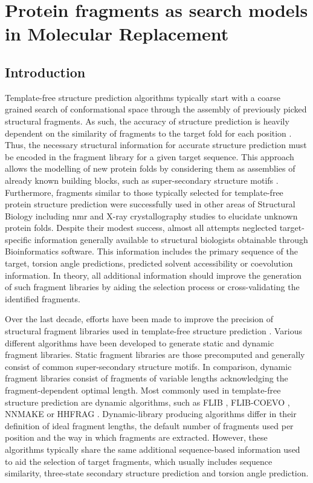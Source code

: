 \chapter{Protein fragments as search models in Molecular Replacement} \label{chap:ample_flib}
\clearpage

\section{Introduction}
Template-free structure prediction algorithms typically start with a coarse grained search of conformational space through the assembly of previously picked structural fragments. As such, the accuracy of structure prediction is heavily dependent on the similarity of fragments to the target fold for each position \cite{Gront2011-sv}. Thus, the necessary structural information for accurate structure prediction must be encoded in the fragment library for a given target sequence. This approach allows the modelling of new protein folds by considering them as assemblies of already known building blocks, such as super-secondary structure motifs \cite{Fernandez-Fuentes2010-ea}. Furthermore, fragments similar to those typically selected for template-free protein structure prediction were successfully used in other areas of Structural Biology including \gls{nmr} \cite{Delaglio2000-fx,Kontaxis2005-ea} and X-ray crystallography \cite{Jones1986-rd} studies to elucidate unknown protein folds. Despite their modest success, almost all attempts neglected target-specific information generally available to structural biologists obtainable through Bioinformatics software. This information includes the primary sequence of the target, torsion angle predictions, predicted solvent accessibility or coevolution information. In theory, all additional information should improve the generation of such fragment libraries by aiding the selection process or cross-validating the identified fragments.

Over the last decade, efforts have been made to improve the precision of structural fragment libraries used in template-free structure prediction \cite{Abbass2015-qk,Shen2013-wh,Li2008-xu,Kalev2011-sz,Bhattacharya2016-ix,Wang2017-ka,De_Oliveira2015-kb,De_Oliveira2018-za,Gront2011-sv}. Various different algorithms have been developed to generate static and dynamic fragment libraries. Static fragment libraries are those precomputed and generally consist of common super-secondary structure motifs. In comparison, dynamic fragment libraries consist of fragments of variable lengths acknowledging the fragment-dependent optimal length. Most commonly used in template-free structure prediction are dynamic algorithms, such as FLIB \cite{De_Oliveira2015-kb}, FLIB-COEVO \cite{De_Oliveira2018-za}, NNMAKE \cite{Gront2011-sv} or HHFRAG \cite{Kalev2011-sz}. Dynamic-library producing algorithms differ in their definition of ideal fragment lengths, the default number of fragments used per position and the way in which fragments are extracted. However, these algorithms typically share the same additional sequence-based information used to aid the selection of target fragments, which usually includes sequence similarity, three-state secondary structure prediction and torsion angle prediction.

